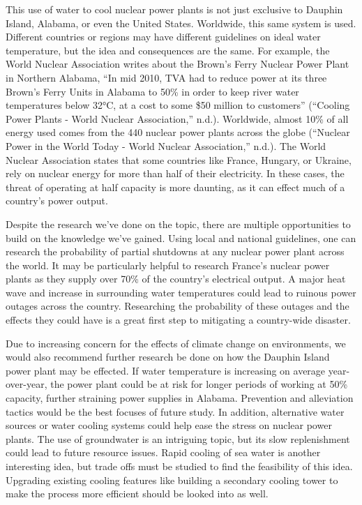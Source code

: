 \documentclass[
  letterpaper,
  DIV=11,
  numbers=noendperiod]{scrreprt}
\begin{document}
This use of water to cool nuclear power plants is not just exclusive to
Dauphin Island, Alabama, or even the United States. Worldwide, this same
system is used. Different countries or regions may have different
guidelines on ideal water temperature, but the idea and consequences are
the same. For example, the World Nuclear Association writes about the
Brown's Ferry Nuclear Power Plant in Northern Alabama, ``In mid 2010,
TVA had to reduce power at its three Brown's Ferry Units in Alabama to
50\% in order to keep river water temperatures below 32°C, at a cost to
some \$50 million to customers'' ({``Cooling Power Plants - World
Nuclear Association,''} n.d.). Worldwide, almost 10\% of all energy used
comes from the 440 nuclear power plants across the globe ({``Nuclear
Power in the World Today - World Nuclear Association,''} n.d.). The
World Nuclear Association states that some countries like France,
Hungary, or Ukraine, rely on nuclear energy for more than half of their
electricity. In these cases, the threat of operating at half capacity is
more daunting, as it can effect much of a country's power output.

Despite the research we've done on the topic, there are multiple
opportunities to build on the knowledge we've gained. Using local and
national guidelines, one can research the probability of partial
shutdowns at any nuclear power plant across the world. It may be
particularly helpful to research France's nuclear power plants as they
supply over 70\% of the country's electrical output. A major heat wave
and increase in surrounding water temperatures could lead to ruinous
power outages across the country. Researching the probability of these
outages and the effects they could have is a great first step to
mitigating a country-wide disaster.

Due to increasing concern for the effects of climate change on
environments, we would also recommend further research be done on how
the Dauphin Island power plant may be effected. If water temperature is
increasing on average year-over-year, the power plant could be at risk
for longer periods of working at 50\% capacity, further straining power
supplies in Alabama. Prevention and alleviation tactics would be the
best focuses of future study. In addition, alternative water sources or
water cooling systems could help ease the stress on nuclear power
plants. The use of groundwater is an intriguing topic, but its slow
replenishment could lead to future resource issues. Rapid cooling of sea
water is another interesting idea, but trade offs must be studied to
find the feasibility of this idea. Upgrading existing cooling features
like building a secondary cooling tower to make the process more
efficient should be looked into as well.
\end{document}
